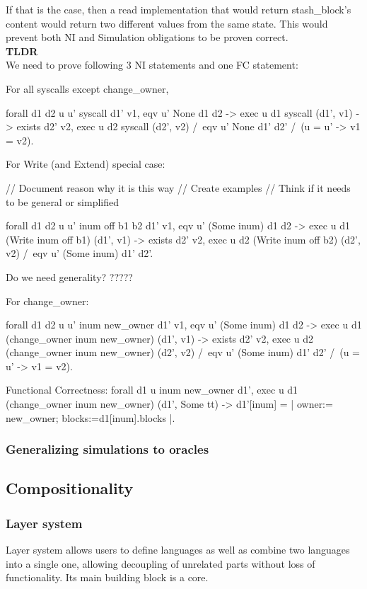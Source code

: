 \documentclass[onecolumn]{paper}
\begin{document}
			If that is the case, then a read implementation that would return stash\_block's content would return two different values from the same state. This would prevent both NI and Simulation obligations to be proven correct.\\
			
			{\bf TLDR}\\
			We need to prove following 3 NI statements and one FC statement:
			
			For all syscalls except change\_owner,
			
			forall d1 d2 u u' syscall d1' v1,
			eqv u' None d1 d2 ->
			exec u d1 syscall (d1', v1) ->
			exists d2' v2,
			exec u d2 syscall (d2', v2) /\
			eqv u' None d1' d2' /\
			(u = u' -> v1 = v2).
			
			For Write (and Extend) special case:
			
			// Document reason why it is this way
			// Create examples
			// Think if it needs to be general or simplified
			
			forall d1 d2 u u' inum off b1 b2 d1' v1,
			eqv u' (Some inum) d1 d2 ->
			exec u d1 (Write inum off b1) (d1', v1) ->
			exists d2' v2,
			exec u d2 (Write inum off b2) (d2', v2) /\
			eqv u' (Some inum) d1' d2'.
			
			
			
			Do we need generality?
			?????
			
			For change\_owner:
			
			forall d1 d2 u u' inum new\_owner d1' v1,
			eqv u' (Some inum) d1 d2 ->
			exec u d1 (change\_owner inum new\_owner) (d1', v1) ->
			exists d2' v2,
			exec u d2 (change\_owner inum new\_owner) (d2', v2) /\
			eqv u' (Some inum) d1' d2' /\
			(u = u' -> v1 = v2).	
			
			
			
			
			Functional Correctness:
			forall d1 u inum new\_owner d1',
			exec u d1 (change\_owner inum new\_owner) (d1', Some tt) ->
			d1'[inum] = {| owner:= new\_owner; blocks:=d1[inum].blocks |}.
			
			
			
		\subsubsection{Generalizing simulations to oracles}

	\subsection{Compositionality}
		\subsubsection{Layer system}
		Layer system allows users to define languages as well as combine two languages into a single one, allowing decoupling of unrelated parts without loss of functionality.
		Its main building block is a core.\\ 
		
\end{document}
